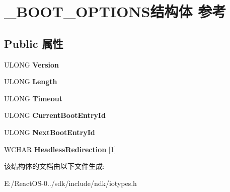 \hypertarget{struct___b_o_o_t___o_p_t_i_o_n_s}{}\section{\+\_\+\+B\+O\+O\+T\+\_\+\+O\+P\+T\+I\+O\+N\+S结构体 参考}
\label{struct___b_o_o_t___o_p_t_i_o_n_s}
\subsection*{Public 属性}
\begin{DoxyCompactItemize}
\item 
\mbox{\label{struct___b_o_o_t___o_p_t_i_o_n_s_acef47529f08cd846390e01222b1ca53b}} 
U\+L\+O\+NG {\bfseries Version}
\item 
\mbox{\label{struct___b_o_o_t___o_p_t_i_o_n_s_ab0d57ada20f522f5f969b1a5d9e6d3f2}} 
U\+L\+O\+NG {\bfseries Length}
\item 
\mbox{\label{struct___b_o_o_t___o_p_t_i_o_n_s_aa99ced300b421b060a725642ef14e93d}} 
U\+L\+O\+NG {\bfseries Timeout}
\item 
\mbox{\label{struct___b_o_o_t___o_p_t_i_o_n_s_a9925a081353a72392a69eba244a8515c}} 
U\+L\+O\+NG {\bfseries Current\+Boot\+Entry\+Id}
\item 
\mbox{\label{struct___b_o_o_t___o_p_t_i_o_n_s_a50f51694737cc3bc35bb405c4f5588d2}} 
U\+L\+O\+NG {\bfseries Next\+Boot\+Entry\+Id}
\item 
\mbox{\label{struct___b_o_o_t___o_p_t_i_o_n_s_afdc148d16c10884305d64190c8cfd083}} 
W\+C\+H\+AR {\bfseries Headless\+Redirection} \mbox{[}1\mbox{]}
\end{DoxyCompactItemize}


该结构体的文档由以下文件生成\+:\begin{DoxyCompactItemize}
\item 
E\+:/\+React\+O\+S-\/0../sdk/include/ndk/iotypes.\+h\end{DoxyCompactItemize}
